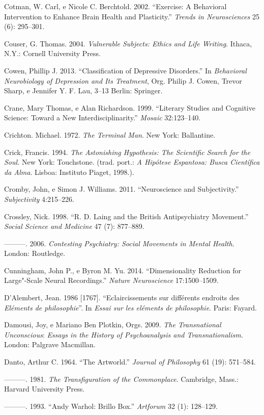 Cotman, W. Carl, e Nicole C. Berchtold. 2002. ``Exercise: A Behavioral
Intervention to Enhance Brain Health and Plasticity.'' \emph{Trends in
Neurosciences} 25 (6): 295--301.

Couser, G. Thomas. 2004. \emph{Vulnerable Subjects: Ethics and Life
Writing}. Ithaca, N.Y.: Cornell University Press.

Cowen, Phillip J. 2013. ``Classification of Depressive Disorders.'' In
\emph{Behavioral Neurobiology of Depression and Its Treatment}, Org.
Philip J. Cowen, Trevor Sharp, e Jennifer Y. F. Lau, 3--13 Berlin:
Springer.

Crane, Mary Thomas, e Alan Richardson. 1999. ``Literary Studies and
Cognitive Science: Toward a New Interdisciplinarity.'' \emph{Mosaic}
32:123--140.

Crichton. Michael. 1972. \emph{The Terminal Man}. New York: Ballantine.

Crick, Francis. 1994. \emph{The Astonishing Hypothesis: The Scientific
Search for the Soul.} New York: Touchstone. (trad. port.: \emph{A
Hipótese Espantosa: Busca Científica da Alma}. Lisboa: Instituto Piaget,
1998.).

Cromby, John, e Simon J. Williams. 2011. ``Neuroscience and
Subjectivity.'' \emph{Subjectivity} 4:215--226.

Crossley, Nick. 1998. ``R. D. Laing and the British Antipsychiatry
Movement.'' \emph{Social Science and Medicine} 47 (7): 877--889.

---------. 2006. \emph{Contesting Psychiatry: Social Movements in Mental
Health.} London: Routledge.

Cunningham, John P., e Byron M. Yu. 2014. ``Dimensionality Reduction for
Large"-Scale Neural Recordings.'' \emph{Nature Neuroscience}
17:1500--1509.

D'Alembert, Jean. 1986 {[}1767{]}. ``Eclaircissements sur différents
endroits des \emph{Eléments de philosophie}''. In \emph{Essai sur les
eléments de philosophie}. Paris: Fayard.

Damousi, Joy, e Mariano Ben Plotkin, Orgs. 2009. \emph{The Transnational
Unconscious}: \emph{Essays in the History of Psychoanalysis and
Transnationalism.} London: Palgrave Macmillan.

Danto, Arthur C. 1964. ``The Artworld.'' \emph{Journal of Philosophy} 61
(19): 571--584.

---------. 1981. \emph{The Transfiguration of the Commonplace}.
Cambridge, Mass.: Harvard University Press.

---------. 1993. ``Andy Warhol: Brillo Box.'' \emph{Artforum} 32 (1):
128--129.

